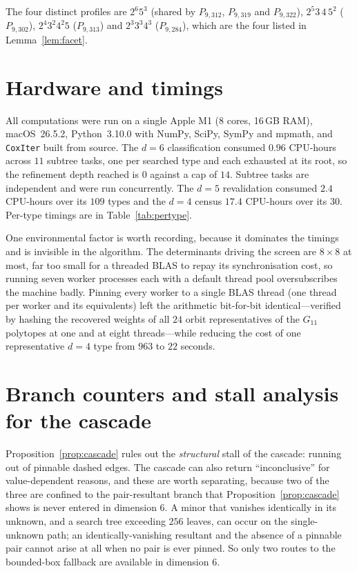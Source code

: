 \documentclass[11pt,reqno]{amsart}
\theoremstyle{plain}
\theoremstyle{definition}
\newcommand{\NumSubtrees}{11}
\newcommand{\CPUHours}{0.96}
\newcommand{\DFiveTypes}{109}
\newcommand{\DFiveCPUHours}{2.4}
\newcommand{\MaxDepth}{0}
\begin{document}
The four distinct profiles are $2^6 5^3$ (shared by $P_{9,312}$, $P_{9,319}$ and
$P_{9,322}$), $2^5 3\,4\,5^2$ ($P_{9,302}$), $2^4 3^2 4^2 5$ ($P_{9,313}$) and
$2^3 3^3 4^3$ ($P_{9,284}$), which are the four listed in Lemma~\ref{lem:facet}.

\section{Hardware and timings}
\label{app:timings}
All computations were run on a single Apple M1 (8 cores, 16\,GB RAM),
macOS~26.5.2, Python~3.10.0 with NumPy, SciPy, SymPy and mpmath, and
\texttt{CoxIter} built from source. The $d=6$ classification consumed
$\CPUHours$ CPU-hours across $\NumSubtrees$ subtree tasks, one per searched type
and each exhausted at its root, so the refinement depth reached is $\MaxDepth$
against a cap of $14$. Subtree tasks are independent and were run concurrently. The
$d=5$ revalidation consumed $\DFiveCPUHours$ CPU-hours over its $\DFiveTypes$
types and the $d=4$ census $17.4$ CPU-hours over its $30$. Per-type timings are
in Table~\ref{tab:pertype}.

One environmental factor is worth recording, because it dominates the timings and
is invisible in the algorithm. The determinants driving the screen are $8\times8$
at most, far too small for a threaded BLAS to repay its synchronisation cost, so
running seven worker processes each with a default thread pool oversubscribes the
machine badly. Pinning every worker to a single BLAS thread
(one thread per worker and its equivalents) left the arithmetic
bit-for-bit identical---verified by hashing the recovered weights of all $24$
orbit representatives of the $G_{11}$ polytopes at one and at eight threads---while
reducing the cost of one representative $d=4$ type from $963$ to $22$ seconds.

\section{Branch counters and stall analysis for the cascade}
\label{app:counters}

Proposition~\ref{prop:cascade} rules out the \emph{structural} stall of the cascade:
running out of pinnable dashed edges. The cascade can also return
``inconclusive'' for value-dependent reasons, and these are worth separating,
because two of the three are confined to the pair-resultant branch that
Proposition~\ref{prop:cascade} shows is never entered in dimension $6$. A minor
that vanishes identically in its unknown, and a search tree exceeding $256$ leaves,
can occur on the single-unknown path; an identically-vanishing resultant and the
absence of a pinnable pair cannot arise at all when no pair is ever pinned. So only
two routes to the bounded-box fallback are available in dimension $6$.
\end{document}
